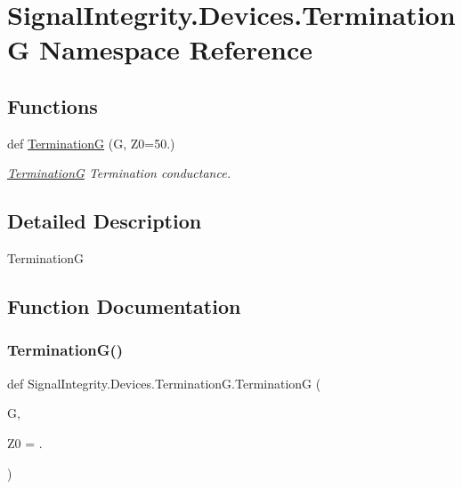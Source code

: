 \hypertarget{namespaceSignalIntegrity_1_1Devices_1_1TerminationG}{}\section{Signal\+Integrity.\+Devices.\+TerminationG Namespace Reference}
\label{namespaceSignalIntegrity_1_1Devices_1_1TerminationG}
\subsection*{Functions}
\begin{DoxyCompactItemize}
\item 
def \hyperlink{namespaceSignalIntegrity_1_1Devices_1_1TerminationG_a336cc052a8d613191d43943b8ff8f1eb}{TerminationG} (G, Z0=50.)
\begin{DoxyCompactList}\small\item\em \hyperlink{namespaceSignalIntegrity_1_1Devices_1_1TerminationG}{TerminationG} Termination conductance. \end{DoxyCompactList}\end{DoxyCompactItemize}


\subsection{Detailed Description}
\begin{DoxyVerb}TerminationG\end{DoxyVerb}
 

\subsection{Function Documentation}
\mbox{\label{namespaceSignalIntegrity_1_1Devices_1_1TerminationG_a336cc052a8d613191d43943b8ff8f1eb}} 
\subsubsection{\texorpdfstring{Termination\+G()}{TerminationG()}}
{\footnotesize\ttfamily def Signal\+Integrity.\+Devices.\+Termination\+G.\+TerminationG (\begin{DoxyParamCaption}\item[{}]{G,  }\item[{}]{Z0 = {.} }\end{DoxyParamCaption})}



